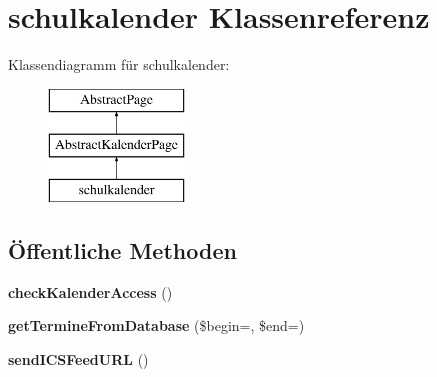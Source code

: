 \hypertarget{classschulkalender}{}\section{schulkalender Klassenreferenz}
\label{classschulkalender}
Klassendiagramm für schulkalender\+:\begin{figure}[H]
\begin{center}
\leavevmode
\includegraphics[height=3.000000cm]{classschulkalender}
\end{center}
\end{figure}
\subsection*{Öffentliche Methoden}
\begin{DoxyCompactItemize}
\item 
\mbox{\label{classschulkalender_adf1698d8dc039449f9fd52f490364857}} 
{\bfseries check\+Kalender\+Access} ()
\item 
\mbox{\label{classschulkalender_ace67339c28b17c46ae3709faf0a55290}} 
{\bfseries get\+Termine\+From\+Database} (\$begin=\textquotesingle{}\textquotesingle{}, \$end=\textquotesingle{}\textquotesingle{})
\item 
\mbox{\label{classschulkalender_ae1b1c6ac3bf1368cca29677af9d7f84d}} 
{\bfseries send\+I\+C\+S\+Feed\+U\+RL} ()
\end{DoxyCompactItemize}
